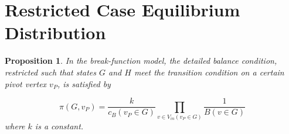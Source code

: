 \documentclass[a4paper,10pt]{article}
\newtheorem{prop}{Proposition}
\begin{document}
\section{Restricted Case Equilibrium Distribution}

\begin{prop}
\label{prop:break-restricted}
 In the break-function model, the detailed balance condition, restricted such that states $G$ and $H$ meet the transition condition on a certain pivot vertex $v_P$, is satisfied by

 \begin{equation}
 \label{eqn:pi-k1-break}
  \pi(G, v_P) =  \frac{k}{c_B(v_P \in G)} 
 \prod \limits_{v \in V_{in}(v_P \in G)} \frac{1}{B(v \in G)}
 \end{equation}
where $k$ is a constant.
\end{prop}
\end{document}
